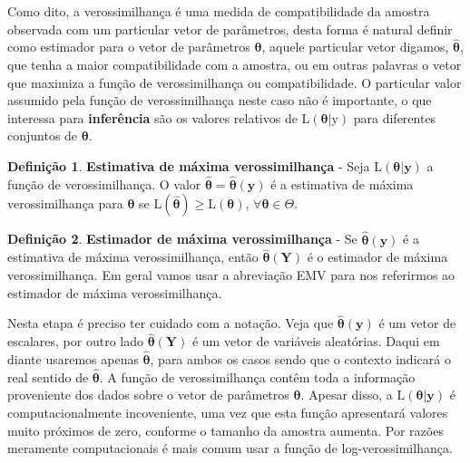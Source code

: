 \documentclass[
  9pt,
  a5paper,
]{book}
\theoremstyle{definition}
\newtheorem{definition}{Definição}[chapter]
\theoremstyle{definition}
\theoremstyle{definition}
\theoremstyle{definition}
\theoremstyle{remark}
\begin{document}
Como dito, a verossimilhança é uma medida de compatibilidade da amostra observada com um particular vetor de parâmetros, desta forma é natural definir como estimador para o vetor de parâmetros \(\boldsymbol{\theta}\), aquele particular vetor digamos, \(\hat{\boldsymbol{\theta}}\), que tenha a maior compatibilidade com a amostra, ou em outras palavras o vetor que maximiza a função de verossimilhança ou compatibilidade.
O particular valor assumido pela função de verossimilhança neste caso não é importante,
o que interessa para \textbf{inferência} são os valores relativos de
\(\mathrm{L}(\boldsymbol{\theta}|\mathrm{y})\) para diferentes conjuntos de \(\boldsymbol{\theta}\).

\begin{definition}
\protect\hypertarget{def:unnamed-chunk-12}{}\label{def:unnamed-chunk-12}\textbf{Estimativa de máxima verossimilhança} -
Seja \(\mathrm{L}(\boldsymbol{\theta}|\mathbf{y})\) a função de verossimilhança.
O valor \(\hat{\boldsymbol{\theta}} = \hat{\boldsymbol{\theta}}(\mathbf{y})\) é a estimativa de máxima verossimilhança para \(\boldsymbol{\theta}\) se \(\mathrm{L}(\hat{\boldsymbol{\theta}}) \ge \mathrm{L}(\boldsymbol{\theta})\), \(\forall \boldsymbol{\theta} \in \Theta\).
\end{definition}

\begin{definition}
\protect\hypertarget{def:unnamed-chunk-13}{}\label{def:unnamed-chunk-13}\textbf{Estimador de máxima verossimilhança} - Se \(\hat{\boldsymbol{\theta}}(\mathbf{y})\) é a estimativa de máxima verossimilhança, então \(\hat{\boldsymbol{\theta}}(\mathbf{Y})\) é o estimador de máxima verossimilhança. Em geral vamos usar a abreviação EMV para nos referirmos ao estimador de máxima verossimilhança.
\end{definition}

Nesta etapa é preciso ter cuidado com a notação. Veja que \(\hat{\boldsymbol{\theta}}(\mathbf{y})\) é um vetor de escalares, por outro lado \(\hat{\boldsymbol{\theta}}(\mathbf{Y})\) é um vetor de variáveis aleatórias. Daqui em diante usaremos apenas \(\hat{\boldsymbol{\theta}}\), para ambos os casos sendo que o contexto indicará o real sentido de \(\hat{\boldsymbol{\theta}}\). A função de verossimilhança contêm toda a informação proveniente dos dados sobre o vetor de parâmetros \(\boldsymbol{\theta}\). Apesar disso, a \(\mathrm{L}(\boldsymbol{\theta}|\mathbf{y})\) é computacionalmente incoveniente, uma vez que esta função apresentará valores muito próximos de zero, conforme o tamanho da amostra aumenta. Por razões meramente computacionais é mais comum usar a função de log-verossimilhança.
\end{document}
